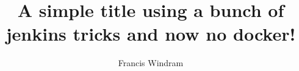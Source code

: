 \documentclass[]{article}
\title{A simple title using a bunch of jenkins tricks and now no docker!}
\author{Francis Windram}
\begin{document}
\maketitle

\begin{abstract}

\end{abstract}

\section{}
\end{document}
